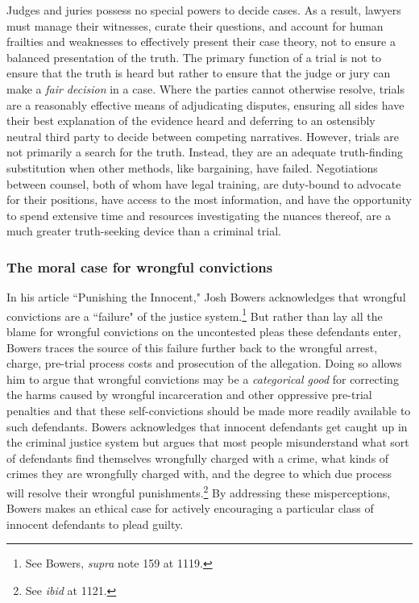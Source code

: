 Judges and juries possess no special powers to decide cases. As a result, lawyers must manage their witnesses, curate their questions, and account for human frailties and weaknesses to effectively present their case theory, not to ensure a balanced presentation of the truth. The primary function of a trial is not to ensure that the truth is heard but rather to ensure that the judge or jury can make a \textit{fair decision} in a case. Where the parties cannot otherwise resolve, trials are a reasonably effective means of adjudicating disputes, ensuring all sides have their best explanation of the evidence heard and deferring to an ostensibly neutral third party to decide between competing narratives. However, trials are not primarily a search for the truth. Instead, they are an adequate truth-finding substitution when other methods, like bargaining, have failed. Negotiations between counsel, both of whom have legal training, are duty-bound to advocate for their positions, have access to the most information, and have the opportunity to spend extensive time and resources investigating the nuances thereof, are a much greater truth-seeking device than a criminal trial.

\subsubsection{The moral case for wrongful convictions}

In his article ``Punishing the Innocent," Josh Bowers acknowledges that wrongful convictions are a ``failure" of the justice system.\footnote{See Bowers, \textit{supra} note 159 at 1119.} But rather than lay all the blame for wrongful convictions on the uncontested pleas these defendants enter, Bowers traces the source of this failure further back to the wrongful arrest, charge, pre-trial process costs and prosecution of the allegation. Doing so allows him to argue that wrongful convictions may be a \textit{categorical good} for correcting the harms caused by wrongful incarceration and other oppressive pre-trial penalties and that these self-convictions should be made more readily available to such defendants. Bowers acknowledges that innocent defendants get caught up in the criminal justice system but argues that most people misunderstand what sort of defendants find themselves wrongfully charged with a crime, what kinds of crimes they are wrongfully charged with, and the degree to which due process will resolve their wrongful punishments.\footnote{See \textit{ibid} at 1121.} By addressing these misperceptions, Bowers makes an ethical case for actively encouraging a particular class of innocent defendants to plead guilty.

